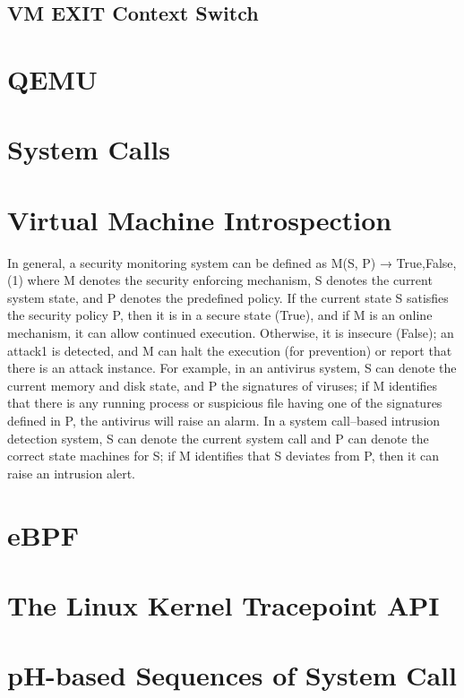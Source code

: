 \documentclass{report}
\begin{document}
\begin{spacing}{1.5}
\subsection{VM EXIT Context Switch}
\section{QEMU}
\section{System Calls}
\section{Virtual Machine Introspection}

In general, a security monitoring system can be defined as
M(S, P) → {True,False}, (1)
where M denotes the security enforcing mechanism, S denotes the current system
state, and P denotes the predefined policy. If the current state S satisfies the security
policy P, then it is in a secure state (True), and if M is an online mechanism, it can
allow continued execution. Otherwise, it is insecure (False); an attack1 is detected, and
M can halt the execution (for prevention) or report that there is an attack instance.
For example, in an antivirus system, S can denote the current memory and disk state,
and P the signatures of viruses; if M identifies that there is any running process or
suspicious file having one of the signatures defined in P, the antivirus will raise an
alarm. In a system call–based intrusion detection system, S can denote the current
system call and P can denote the correct state machines for S; if M identifies that
S deviates from P, then it can raise an intrusion alert.


\section{eBPF}
\section{The Linux Kernel Tracepoint API}
\section{pH-based Sequences of System Call}



{\large


}
\end{spacing}
\end{document}
